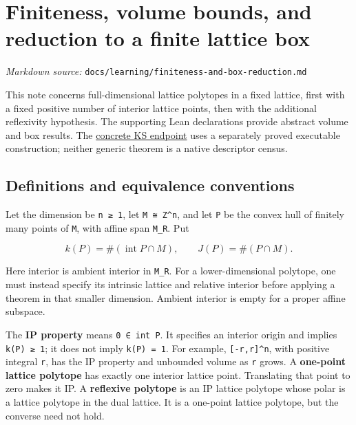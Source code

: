 \documentclass[11pt,a4paper,oneside]{report}
\begin{document}
\chapter{Finiteness, volume bounds, and reduction to a finite lattice
box}\label{finiteness-and-box-reduction--finiteness-volume-bounds-and-reduction-to-a-finite-lattice-box}

\noindent\textit{Markdown source: }\texttt{docs/\allowbreak{}learning\allowbreak{}/\allowbreak{}finitene\allowbreak{}ss-\allowbreak{}and-\allowbreak{}box-\allowbreak{}reductio\allowbreak{}n.\allowbreak{}md}

This note concerns full-dimensional lattice polytopes in a fixed
lattice, first with a fixed positive number of interior lattice points,
then with the additional reflexivity hypothesis. The supporting Lean
declarations provide abstract volume and box results. The
\href{../../proofs/STATEMENTS.md}{concrete KS endpoint} uses a
separately proved executable construction; neither generic theorem is a
native descriptor census.

\section{Definitions and equivalence
conventions}\label{finiteness-and-box-reduction--definitions-and-equivalence-conventions}

Let the dimension be \texttt{n ≥ 1}, let
\texttt{M ≅ Z\textasciicircum{}n}, and let \texttt{P} be the convex hull
of finitely many points of \texttt{M}, with affine span
\texttt{M\_\allowbreak{}R}. Put

\[
k(P)=\#(\operatorname{int}P\cap M),\qquad
J(P)=\#(P\cap M).
\]

Here interior is ambient interior in \texttt{M\_\allowbreak{}R}. For a
lower-dimensional polytope, one must instead specify its intrinsic
lattice and relative interior before applying a theorem in that smaller
dimension. Ambient interior is empty for a proper affine subspace.

The \textbf{IP property} means \texttt{0 ∈ int P}. It specifies an
interior origin and implies \texttt{k(\allowbreak{}P)\allowbreak{} ≥ 1};
it does not imply
\texttt{k(\allowbreak{}P)\allowbreak{} =\allowbreak{} 1}. For example,
\texttt{[\allowbreak{}-\allowbreak{}r,\allowbreak{}r]\allowbreak{}\textasciicircum{}n},
with positive integral \texttt{r}, has the IP property and unbounded
volume as \texttt{r} grows. A \textbf{one-point lattice polytope} has
exactly one interior lattice point. Translating that point to zero makes
it IP. A \textbf{reflexive polytope} is an IP lattice polytope whose
polar is a lattice polytope in the dual lattice. It is a one-point
lattice polytope, but the converse need not hold.
\end{document}
